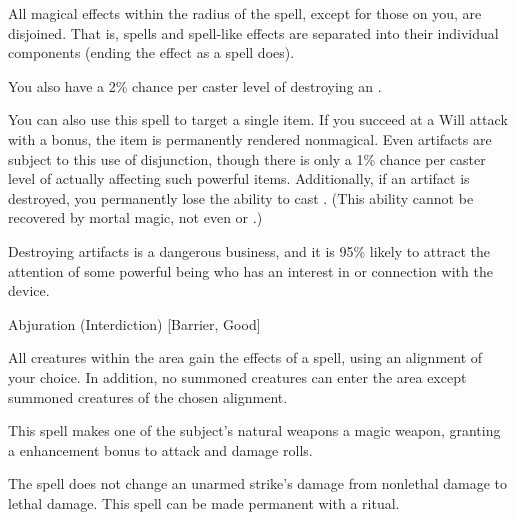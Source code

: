 \spellrng{\rngmed}
\begin{spelleffect}
  All magical effects within the radius of the spell, except for those on you, are disjoined. That is, spells and spell-like effects are separated into their individual components (ending the effect as a  spell does).
  \par You also have a 2\% chance per caster level of destroying an .
  \par You can also use this spell to target a single item. If you succeed at a Will attack with a  bonus, the item is permanently rendered nonmagical. Even artifacts are subject to this use of disjunction, though there is only a 1\% chance per caster level of actually affecting such powerful items. Additionally, if an artifact is destroyed, you permanently lose the ability to cast . (This ability cannot be recovered by mortal magic, not even  or .)
  \par {} Destroying artifacts is a dangerous business, and it is 95\% likely to attract the attention of some powerful being who has an interest in or connection with the device.
\end{spelleffect}

\par Abjuration (Interdiction) [Barrier, Good]
\begin{spelleffect}
    All creatures within the area gain the effects of a  spell, using an alignment of your choice. In addition, no summoned creatures can enter the area except summoned creatures of the chosen alignment.
\end{spelleffect}

\spellrng{\rngclose}
\spelldur{\durshort}
\begin{spelleffect}
  This spell makes one of the subject's natural weapons a  magic weapon, granting a  enhancement bonus to attack and damage rolls. \bonusscalingdescription
\end{spelleffect}
\begin{spellnotes}
  The spell does not change an unarmed strike's damage from nonlethal damage to lethal damage. This spell can be made permanent with a  ritual.
\end{spellnotes}

